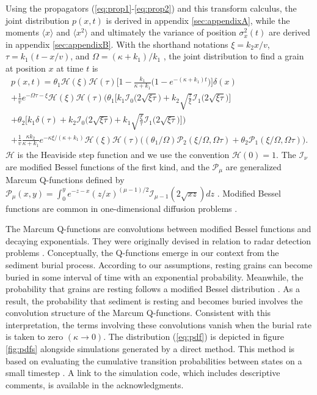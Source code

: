 \documentclass[]{agujournal2018}
\newcommand\bra{\langle}
\newcommand\ket{\rangle}
\begin{document}
Using the propagators (\ref{eq:prop1}-\ref{eq:prop2}) and this transform calculus, the joint distribution $p(x,t)$ is derived in appendix \ref{sec:appendixA}, while the moments $\bra x \ket$ and $\bra x^2 \ket$ and ultimately the variance of position $\sigma_x^2(t)$ are derived in appendix \ref{sec:appendixB}. With the shorthand notations $\xi = k_2 x/v$, $\tau = k_1(t-x/v)$, and $\Omega = (\kappa+k_1)/k_1$ \citep[cf.][]{Lisle1998}, the joint distribution to find a grain at position $x$ at time $t$ is 
\begin{multline}
p(x,t) = \theta_1\mathcal{H}(\xi)\mathcal{H}(\tau)\Big[1-\frac{k_1}{\kappa+k_1}\Big(1-e^{-(\kappa+k_1)t}\Big)\Big]\delta(x) \\ + \frac{1}{v}e^{-\Omega \tau - \xi}\mathcal{H}(\xi)\mathcal{H}(\tau)\Big(\theta_1\Big[k_1\mathcal{I}_0\big(2\sqrt{\xi\tau}\big) + k_2\sqrt{\frac{\tau}{\xi}}\mathcal{I}_1\big(2\sqrt{\xi\tau}\big)\Big] \\ + \theta_2\Big[k_1\delta(\tau) + k_2 \mathcal{I}_0\big(2\sqrt{\xi\tau}\big)+k_1 \sqrt{\frac{\xi}{\tau}}\mathcal{I}_1\big(2\sqrt{\xi\tau}\big)\Big]\Big) \\
+ \frac{1}{v}\frac{\kappa k_2}{\kappa + k_1}e^{-\kappa \xi/(\kappa + k_1)}\mathcal{H}(\xi)\mathcal{H}(\tau)\Big((\theta_1/\Omega)\mathcal{P}_2(\xi/\Omega,\Omega\tau) + \theta_2 \mathcal{P}_1(\xi/\Omega,\Omega\tau)\Big).
\label{eq:pdf}
\end{multline}
$\mathcal{H}$ is the Heaviside step function and we use the convention $\mathcal{H}(0)=1$.
The $\mathcal{I}_\nu$ are modified Bessel functions of the first kind, and the $\mathcal{P}_\mu$ are generalized Marcum Q-functions defined by $\mathcal{P}_\mu(x,y) = \int_0^y e^{-z-x}(z/x)^{(\mu-1)/2}\mathcal{I}_{\mu-1}(2\sqrt{xz})dz $ \citep{Temme1996}. Modified Bessel functions are common in one-dimensional diffusion problems \citep[e.g.][]{Einstein1937,Giddings1955,Daly2010}. 

The Marcum Q-functions are convolutions between modified Bessel functions and decaying exponentials. They were originally devised in relation to radar detection problems \citep{Marcum1960}. 
Conceptually, the Q-functions emerge in our context from the sediment burial process. According to our assumptions, resting grains can become buried in some interval of time with an exponential probability. Meanwhile, the probability that grains are resting follows a modified Bessel distribution \citep[e.g.][]{Einstein1937,Lisle1998}.
As a result, the probability that sediment is resting and becomes buried involves the convolution structure of the Marcum Q-functions.
Consistent with this interpretation, the terms involving these convolutions vanish when the burial rate is taken to zero $(\kappa \rightarrow 0)$.
The distribution (\ref{eq:pdf}) is depicted in figure \ref{fig:pdfs} alongside simulations generated by a direct method. This method is based on evaluating the cumulative transition probabilities between states on a small timestep \citep[cf.][]{Barik2006}. A link to the simulation code, which includes descriptive comments, is available in the acknowledgments.
\end{document}
